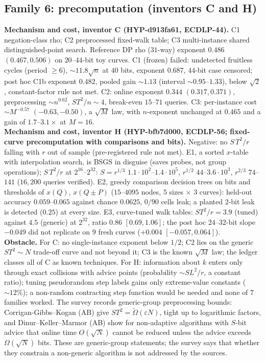 \documentclass[11pt,a4paper]{article}
\theoremstyle{remark}
\begin{document}
\subsection{Family 6: precomputation (inventors C and H)}
\textbf{Mechanism and cost, inventor C (\mbox{HYP-d913fa61}, ECDLP-44).} C1 negation-class rho; C2 preprocessed fixed-walk table; C3 multi-instance shared distinguished-point search. Reference DP rho ($31$-way) exponent $0.486$ $(0.467,0.506)$ on $20$--$44$-bit toy curves. C1 (frozen) failed: undetected fruitless cycles (period $\ge6$), $\sim11.8\sqrt n$ at $40$ bits, exponent $0.687$, $44$-bit case censored; post hoc C1b exponent $0.482$, pooled gain $\sim1.13$ (interval $\sim0.95$--$1.33$), below $\sqrt2$, constant-factor rule not met. C2: online exponent $0.344$ $(0.317,0.371)$, preprocessing $\sim n^{0.62}$, $ST^2/n\sim4$, break-even $15$--$71$ queries. C3: per-instance cost $\sim M^{-0.57}$ $(-0.63,-0.50)$, a $\sqrt M$ law, with $n$-exponent unchanged at $0.465$ and a gain of $1.7$--$3.1\times$ at $M=16$.\\
\textbf{Mechanism and cost, inventor H (\mbox{HYP-bfb7d000}, ECDLP-56; fixed-curve precomputation with comparisons and bits).} Negative: no $S\,T^2/r$ falling with $r$ out of sample (pre-registered rule not met). E1, a sorted $x$-table with interpolation search, is BSGS in disguise (saves probes, not group operations); $S\,T^2/r$ at $2^{16}$--$2^{32}$: $S=r^{1/3}$ $1.1\cdot10^2$--$1.4\cdot10^5$, $r^{1/2}$ $44$--$3.6\cdot10^3$, $r^{2/3}$ $74$--$141$ ($16{,}200$ queries verified). E2, greedy comparison decision trees on bits and thresholds of $x(Q)$, $x(Q\pm P)$ ($15$--$4095$ nodes, $5$ sizes $\times$ $3$ curves): held-out accuracy $0.059$--$0.065$ against chance $0.0625$, $0/90$ cells leak; a planted $2$-bit leak is detected ($0.25$) at every size. E3, curve-tuned walk tables: $ST^2/r=3.9$ (tuned) against $4.5$ (generic) at $2^{32}$, ratio $0.86$ $[0.69,1.06]$; the post hoc $24$--$32$-bit slope $-0.049$ did not replicate on $9$ fresh curves ($+0.004$ $[-0.057,0.064]$).\\
\textbf{Obstacle.} For C: no single-instance exponent below $1/2$; C2 lies on the generic $ST^2\sim N$ trade-off curve and not beyond it; C3 is the known $\sqrt M$ law; the ledger classes all of C as known techniques. For H: information about $k$ enters only through exact collisions with advice points (probability $\sim SL^2/r$, a constant ratio); tuning pseudorandom step labels gains only extreme-value constants ($\sim12\%$); a non-random contracting step function would be needed and none of $7$ families worked. The survey records generic-group preprocessing bounds: Corrigan-Gibbs--Kogan \cite{CGK18} (AB) give $ST^2=\tilde\Omega(\varepsilon N)$, tight up to logarithmic factors, and Dinur--Keller--Marmor \cite{DKM25} (AB) show for non-adaptive algorithms with $S$-bit advice that online time $O(\sqrt N)$ cannot be reduced unless the advice exceeds $\Omega(\sqrt N)$ bits. These are generic-group statements; the survey says that whether they constrain a non-generic algorithm is not addressed by the sources.\\
\end{document}
